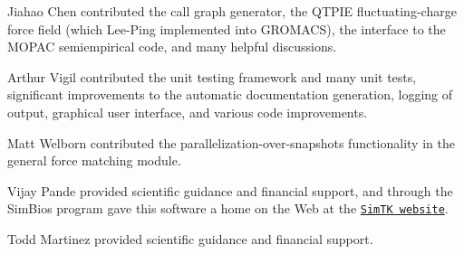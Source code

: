 \begin{DoxyItemize}
\item \-Jiahao \-Chen contributed the call graph generator, the \-Q\-T\-P\-I\-E fluctuating-\/charge force field (which \-Lee-\/\-Ping implemented into \-G\-R\-O\-M\-A\-C\-S), the interface to the \-M\-O\-P\-A\-C semiempirical code, and many helpful discussions.
\end{DoxyItemize}


\begin{DoxyItemize}
\item \-Arthur \-Vigil contributed the unit testing framework and many unit tests, significant improvements to the automatic documentation generation, logging of output, graphical user interface, and various code improvements.
\end{DoxyItemize}


\begin{DoxyItemize}
\item \-Matt \-Welborn contributed the parallelization-\/over-\/snapshots functionality in the general force matching module.
\end{DoxyItemize}


\begin{DoxyItemize}
\item \-Vijay \-Pande provided scientific guidance and financial support, and through the \-Sim\-Bios program gave this software a home on the \-Web at the \href{https://simtk.org/home/forcebalance/}{\tt \-Sim\-T\-K website}.
\end{DoxyItemize}


\begin{DoxyItemize}
\item \-Todd \-Martinez provided scientific guidance and financial support. 
\end{DoxyItemize}